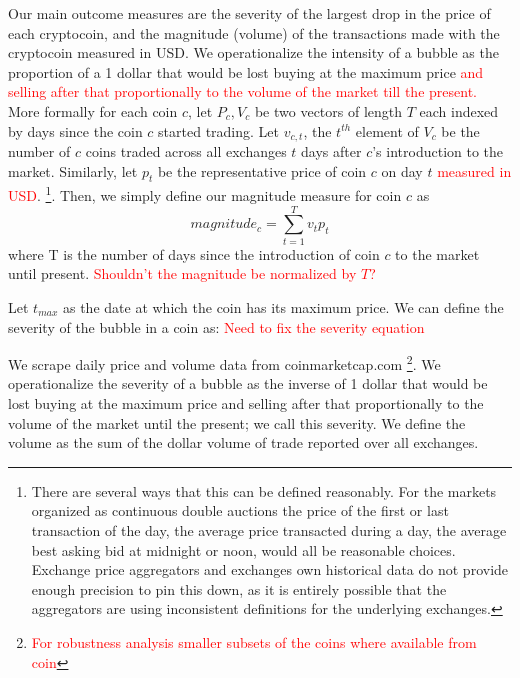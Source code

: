 Our main outcome measures are the severity of the largest drop in the price of each cryptocoin, and the magnitude (volume) of the transactions made with the cryptocoin measured in USD.
We operationalize the intensity of a bubble as the proportion of a 1 dollar that would be lost buying at the maximum price \textcolor{red}{and selling after that proportionally to the volume of the market till the present.}
More formally for each coin $c$, let $P_c,V_c$ be two vectors of length $T$ each indexed by days since the coin $c$ started trading.
Let $v_{c,t}$, the $t^{th}$ element of $V_c$ be the number of $c$ coins traded across all exchanges $t$ days after $c$'s introduction to the market. 
Similarly, let $p_t$ be the representative price of coin $c$ on day $t$ \textcolor{red}{measured in USD}. \footnote{There are several ways that this can be defined reasonably. For the markets organized as continuous double auctions the price of the first or last transaction of the day,  the average price transacted during a day, the average best asking bid at midnight or noon, would all be reasonable choices. Exchange price aggregators and exchanges own historical data do not provide enough precision to pin this down, as it is entirely possible that the aggregators are using inconsistent definitions for the underlying exchanges.}. Then, we simply define our magnitude measure for coin $c$ as
\begin{equation}
magnitude_{c} = \sum_{t=1}^{T} v_t  p_t
\end{equation}
where T is the number of days since the introduction of coin $c$ to the market until present. \textcolor{red}{Shouldn't the magnitude be normalized by $T$?}


Let $t_{max}$ as the date at which the coin has its maximum price.  
We can define the severity of the bubble in a coin as: \textcolor{red}{Need to fix the severity equation}

We scrape daily price and volume data from coinmarketcap.com \footnote{\textcolor{red}{For robustness analysis smaller subsets of the coins where available from coin}}.
We operationalize the severity of a bubble as the inverse of 1 dollar that would be lost buying at the maximum price and selling after that proportionally to the volume of the market until the present; we call this severity.
We define the volume as the sum of the dollar volume of trade reported over all exchanges.